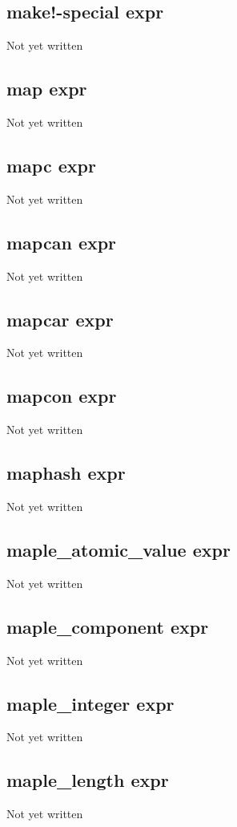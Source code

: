 \documentclass[a4paper,11pt]{article}
\begin{document}
\subsection{\ttfamily make!-special expr}
Not yet written

\subsection{\ttfamily map expr}
Not yet written

\subsection{\ttfamily mapc expr}
Not yet written

\subsection{\ttfamily mapcan expr}
Not yet written

\subsection{\ttfamily mapcar expr}
Not yet written

\subsection{\ttfamily mapcon expr}
Not yet written

\subsection{\ttfamily maphash expr}
Not yet written

\subsection{\ttfamily maple\_atomic\_value expr}
Not yet written

\subsection{\ttfamily maple\_component expr}
Not yet written

\subsection{\ttfamily maple\_integer expr}
Not yet written

\subsection{\ttfamily maple\_length expr}
Not yet written
\end{document}
